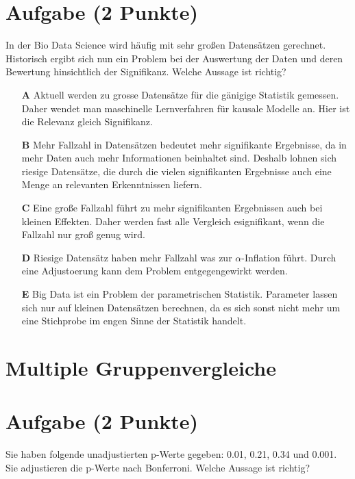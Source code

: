 \documentclass[a4paper, 9pt]{scrartcl}\usepackage[]{graphicx}\usepackage[]{xcolor}
\begin{document}
\section{Aufgabe \hfill (2 Punkte)}



In der Bio Data Science wird häufig mit sehr großen Datensätzen gerechnet. Historisch ergibt sich nun ein Problem bei der Auswertung der Daten und deren Bewertung hinsichtlich der Signifikanz. Welche Aussage ist richtig?





\begin{enumerate}
\item [\textbf{A} \msquare] Aktuell werden zu grosse Datensätze für die gänigige Statistik gemessen. Daher wendet man maschinelle Lernverfahren für kausale Modelle an. Hier ist die Relevanz gleich Signifikanz.
\item [\textbf{B} \msquare] Mehr Fallzahl in Datensätzen bedeutet mehr signifikante Ergebnisse, da in mehr Daten auch mehr Informationen beinhaltet sind. Deshalb lohnen sich riesige Datensätze, die durch die vielen signifikanten Ergebnisse auch eine Menge an relevanten Erkenntnissen liefern.
\item [\textbf{C} \msquare] Eine große Fallzahl führt zu mehr signifikanten Ergebnissen auch bei kleinen Effekten. Daher werden fast alle Vergleich esignifikant, wenn die Fallzahl nur groß genug wird.
\item [\textbf{D} \msquare] Riesige Datensätz haben mehr Fallzahl was zur $\alpha$-Inflation führt. Durch eine Adjustoerung kann dem Problem entgegengewirkt werden.
\item [\textbf{E} \msquare] Big Data ist ein Problem der parametrischen Statistik. Parameter lassen sich nur auf kleinen Datensätzen berechnen, da es sich sonst nicht mehr um eine Stichprobe im engen Sinne der Statistik handelt.
\end{enumerate}
\section*{Multiple Gruppenvergleiche}    

\section{Aufgabe \hfill (2 Punkte)}



Sie haben folgende unadjustierten p-Werte gegeben: 0.01, 0.21, 0.34 und 0.001. Sie adjustieren die p-Werte nach
Bonferroni. Welche Aussage ist richtig?
\end{document}
